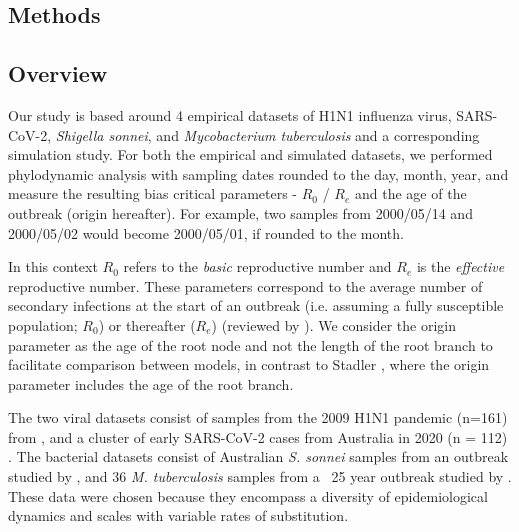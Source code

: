 \documentclass{article}
\begin{document}
\begin{spacing}{1.5}
\section*{Methods}
\subsection*{Overview}
Our study is based around 4 empirical datasets of H1N1 influenza virus, SARS-CoV-2, \textit{Shigella sonnei}, and \textit{Mycobacterium tuberculosis} and a corresponding simulation study. For both the empirical and simulated datasets, we performed phylodynamic analysis with sampling dates rounded to the day, month, year, and measure the resulting bias critical parameters - $R_0$ / $R_e$ and the age of the outbreak (origin hereafter). For example, two samples from 2000/05/14 and 2000/05/02 would become 2000/05/01, if rounded to the month. 

In this context $R_0$ refers to the \textit{basic} reproductive number and $R_e$ is the \textit{effective} reproductive number. These parameters correspond to the average number of secondary infections at the start of an outbreak (i.e. assuming a fully susceptible population; $R_0$) or thereafter ($R_e$) (reviewed by \citep{featherstone2022epidemiological, du2015getting, kuhnert2011phylogenetic}). We consider the origin parameter as the age of the root node and not the length of the root branch to facilitate comparison between models, in contrast to Stadler \citet{stadler2012estimating}, where the origin parameter includes the age of the root branch.

The two viral datasets consist of samples from the 2009 H1N1 pandemic (n=161) from \citet{hedge_2013_real-time}, and a cluster of early SARS-CoV-2 cases from  Australia in 2020 (n = 112) \citep{lane2021genomics}. The bacterial datasets consist of Australian \textit{S. sonnei} samples from an outbreak studied by \citet{ingle_co-circulation_2019}, and 36 \textit{M. tuberculosis} samples from a ~25 year outbreak studied by \citet{kuhnert_tuberculosis_2018}. These data were chosen because they encompass a diversity of epidemiological dynamics and scales with variable rates of substitution.


\end{spacing}
\end{document}
